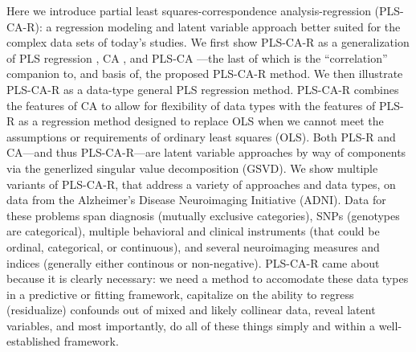 \documentclass[12pt]{article}
\begin{document}
Here we introduce partial least squares-correspondence
analysis-regression (PLS-CA-R): a regression modeling and latent
variable approach better suited for the complex data sets of today's
studies. We first show PLS-CA-R as a generalization of PLS regression
\citep{wold_soft_1975, wold_collinearity_1984, tenenhaus_regression_1998, abdi_partial_2010-1},
CA
\citep{greenacre_theory_1984, greenacre_correspondence_2010-1, lebart_multivariate_1984},
and PLS-CA \citep{beaton_partial_2016}---the last of which is the
``correlation'' companion to, and basis of, the proposed PLS-CA-R
method. We then illustrate PLS-CA-R as a data-type general PLS
regression method. PLS-CA-R combines the features of CA to allow for
flexibility of data types with the features of PLS-R as a regression
method designed to replace OLS when we cannot meet the assumptions or
requirements of ordinary least squares (OLS). Both PLS-R and CA---and
thus PLS-CA-R---are latent variable approaches by way of components via
the generlized singular value decomposition (GSVD). We show multiple
variants of PLS-CA-R, that address a variety of approaches and data
types, on data from the Alzheimer's Disease Neuroimaging Initiative
(ADNI). Data for these problems span diagnosis (mutually exclusive
categories), SNPs (genotypes are categorical), multiple behavioral and
clinical instruments (that could be ordinal, categorical, or
continuous), and several neuroimaging measures and indices (generally
either continous or non-negative). PLS-CA-R came about because it is
clearly necessary: we need a method to accomodate these data types in a
predictive or fitting framework, capitalize on the ability to regress
(residualize) confounds out of mixed and likely collinear data, reveal
latent variables, and most importantly, do all of these things simply
and within a well-established framework.
\end{document}
